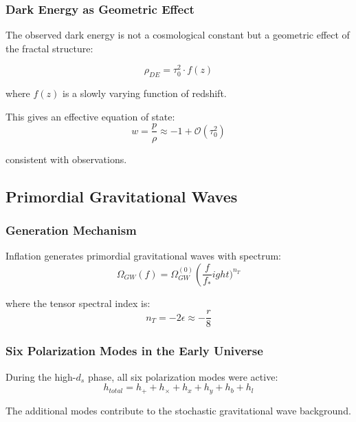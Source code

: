 \subsubsection{Dark Energy as Geometric Effect}

The observed dark energy is not a cosmological constant but a geometric effect of the fractal structure:

\begin{equation}
    \rho_{DE} = \tau_0^2 \cdot f(z)
\end{equation}

where $f(z)$ is a slowly varying function of redshift.

This gives an effective equation of state:
\begin{equation}
    w = \frac{p}{\rho} \approx -1 + \mathcal{O}(\tau_0^2)
\end{equation}

consistent with observations.

\subsection{Primordial Gravitational Waves}

\subsubsection{Generation Mechanism}

Inflation generates primordial gravitational waves with spectrum:
\begin{equation}
    \Omega_{GW}(f) = \Omega_{GW}^{(0)} \left(\frac{f}{f_*}
ight)^{n_T}
\end{equation}

where the tensor spectral index is:
\begin{equation}
    n_T = -2\epsilon \approx -\frac{r}{8}
\end{equation}

\subsubsection{Six Polarization Modes in the Early Universe}

During the high-$d_s$ phase, all six polarization modes were active:
\begin{equation}
    h_{total} = h_+ + h_\times + h_x + h_y + h_b + h_l
\end{equation}

The additional modes contribute to the stochastic gravitational wave background.

